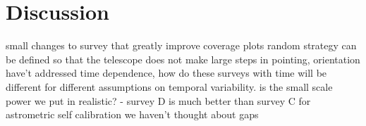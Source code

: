 \documentclass[manuscript]{aastex}
\begin{document}
\section{Discussion}
small changes to survey that greatly improve coverage plots
random strategy can be defined so that the telescope does not make large steps in pointing, orientation
have't addressed time dependence, how do these surveys with time will be different for different assumptions on temporal variability. 
is the small scale power we put in realistic?
- survey D is much better than survey C for astrometric self calibration 
we haven't thought about gaps
\end{document}
